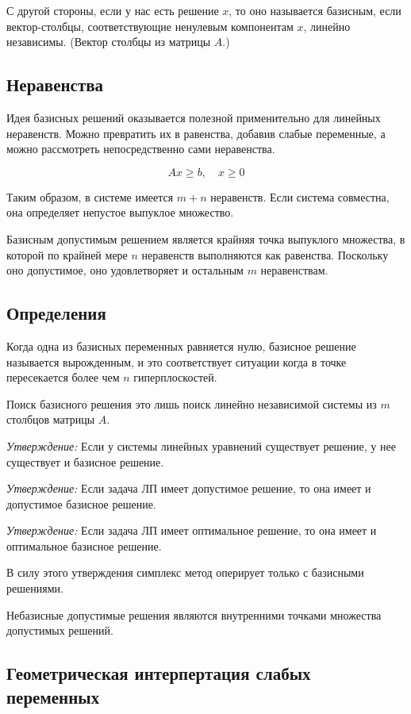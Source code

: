 \documentclass[a4paper,article,14pt]{extarticle}
\begin{document}
С другой стороны, если у нас есть решение \(x\), то оно называется базисным, если вектор-столбцы, соответствующие ненулевым компонентам \(x\), линейно независимы.
(Вектор столбцы из матрицы \(A\).)

\subsection{Неравенства}

Идея базисных решений оказывается полезной применительно для линейных неравенств.
Можно превратить их в равенства, добавив слабые переменные, а можно рассмотреть непосредственно сами неравенства.

\begin{equation}
    Ax \ge b, \quad x \ge 0
\end{equation}

Таким образом, в системе имеется \(m + n\) неравенств.
Если система совместна, она определяет непустое выпуклое множество.

Базисным допустимым решением является крайняя точка выпуклого множества, в которой по крайней мере \(n\) неравенств выполняются как равенства.
Поскольку оно допустимое, оно удовлетворяет и остальным \(m\) неравенствам.

\subsection{Определения}

Когда одна из базисных переменных равняется нулю, базисное решение называется вырожденным, и это соответствует ситуации когда в точке пересекается более чем \(n\) гиперплоскостей.

Поиск базисного решения это лишь поиск линейно независимой системы из \(m\) столбцов матрицы \(A\).

\textit{Утверждение:} Если у системы линейных уравнений существует решение, у нее существует и базисное решение.

\textit{Утверждение:} Если задача ЛП имеет допустимое решение, то она имеет и допустимое базисное решение.

\textit{Утверждение:} Если задача ЛП имеет оптимальное решение, то она имеет и оптимальное базисное решение.

В силу этого утверждения симплекс метод оперирует только с базисными решениями.

Небазисные допустимые решения являются внутренними точками множества допустимых решений.

\subsection{Геометрическая интерпертация слабых переменных}
\end{document}

